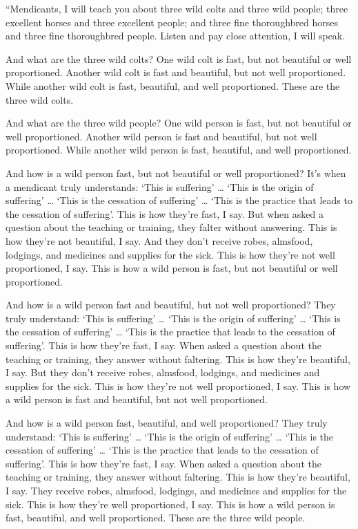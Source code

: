 \documentclass[12pt,openany]{book}%
\begin{document}
“Mendicants, I will teach you about three wild colts and three wild people; three excellent horses and three excellent people; and three fine thoroughbred horses and three fine thoroughbred people. Listen and pay close attention, I will speak. 

And what are the three wild colts? One wild colt is fast, but not beautiful or well proportioned. Another wild colt is fast and beautiful, but not well proportioned. While another wild colt is fast, beautiful, and well proportioned. These are the three wild colts. 

And what are the three wild people? One wild person is fast, but not beautiful or well proportioned. Another wild person is fast and beautiful, but not well proportioned. While another wild person is fast, beautiful, and well proportioned. 

And how is a wild person fast, but not beautiful or well proportioned? It’s when a mendicant truly understands: ‘This is suffering’ … ‘This is the origin of suffering’ … ‘This is the cessation of suffering’ … ‘This is the practice that leads to the cessation of suffering’. This is how they’re fast, I say. But when asked a question about the teaching or training, they falter without answering. This is how they’re not beautiful, I say. And they don’t receive robes, almsfood, lodgings, and medicines and supplies for the sick. This is how they’re not well proportioned, I say. This is how a wild person is fast, but not beautiful or well proportioned. 

And how is a wild person fast and beautiful, but not well proportioned? They truly understand: ‘This is suffering’ … ‘This is the origin of suffering’ … ‘This is the cessation of suffering’ … ‘This is the practice that leads to the cessation of suffering’. This is how they’re fast, I say. When asked a question about the teaching or training, they answer without faltering. This is how they’re beautiful, I say. But they don’t receive robes, almsfood, lodgings, and medicines and supplies for the sick. This is how they’re not well proportioned, I say. This is how a wild person is fast and beautiful, but not well proportioned. 

And how is a wild person fast, beautiful, and well proportioned? They truly understand: ‘This is suffering’ … ‘This is the origin of suffering’ … ‘This is the cessation of suffering’ … ‘This is the practice that leads to the cessation of suffering’. This is how they’re fast, I say. When asked a question about the teaching or training, they answer without faltering. This is how they’re beautiful, I say. They receive robes, almsfood, lodgings, and medicines and supplies for the sick. This is how they’re well proportioned, I say. This is how a wild person is fast, beautiful, and well proportioned. These are the three wild people. 
\end{document}
